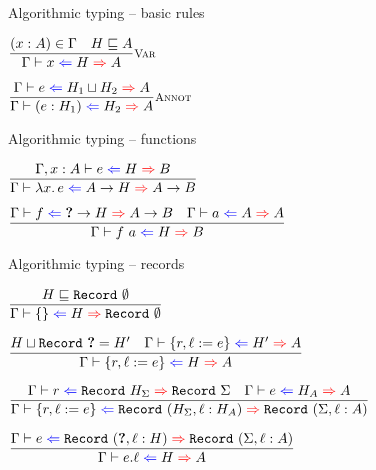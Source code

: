 \documentclass{beamer}
\begin{document}
\begin{frame}{Algorithmic typing -- basic rules}

\begin{center}
  $\infrule[Var]{\sidecond{(x : A) \in \Gamma} \quad \sidecond{\hintorder{H}{A}}}{\hinting{x}{H}{A}}$

  \vspace{2em}

  $\infrule[Annot]{\hinting{e}{\hintlub{H_1}{H_2}}{A}}{\hinting{\annot{e}{H_1}}{H_2}{A}}$
\end{center}

\end{frame}

\begin{frame}{Algorithmic typing -- functions}

\begin{center}
  $\infrule{\hinting[\extend{\Gamma}{x}{A}]{e}{H}{B}}{\hinting{\fun{x}{e}}{\Fun{A}{H}}{\Fun{A}{B}}}$

  \vspace{2em}

  $\infrule{\hinting{f}{\Fun{\Hole}{H}}{\Fun{A}{B}} \quad \hinting{a}{A}{A}}{\hinting{\app{f}{a}}{H}{B}}$
\end{center}

\end{frame}


\begin{frame}{Algorithmic typing -- records}

\begin{center}
  $\infrule{\hintorder{H}{\Record{\emptysig}}}{\hinting{\emptyrecord}{H}{\Record{\emptysig}}}$

  \vspace{2em}


  $\infrule{\sidecond{\hintlub{H}{\Record{\Hole}} = H'} \quad \hinting{\extendrecord{r}{\ell}{e}}{H'}{A}}{\hinting{\extendrecord{r}{\ell}{e}}{H}{A}}$

  \vspace{2em}

  $\infrule{\hinting{r}{\Record{H_\Sigma}}{\Record{\Sigma}} \quad \hinting{e}{H_A}{A}}{\hinting{\extendrecord{r}{\ell}{e}}{\Record{(\extendsig{H_\Sigma}{\ell}{H_A})}}{\Record{(\extendsig{\Sigma}{\ell}{A})}}}$

  \vspace{2em}

  $\infrule{\hinting{e}{\Record{(\extendsig{\Hole}{\ell}{H})}}{\Record{(\extendsig{\Sigma}{\ell}{A})}}}{\hinting{\proj{e}{\ell}}{H}{A}}$
\end{center}

\end{frame}
\end{document}
